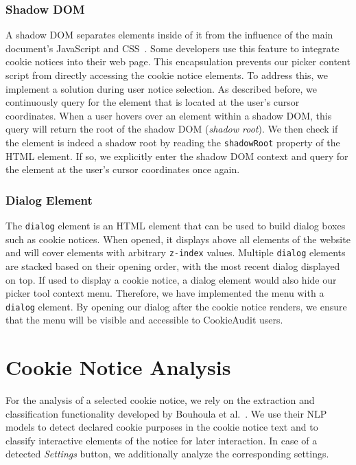 \subsubsection{Shadow DOM}
A shadow DOM separates elements inside of it from the influence of the main document's JavaScript and CSS~\cite{shadowDomMdn}.
Some developers use this feature to integrate cookie notices into their web page.
This encapsulation prevents our picker content script from directly accessing the cookie notice elements. 
To address this, we implement a solution during user notice selection.
As described before, we continuously query for the element that is located at the user's cursor coordinates.
When a user hovers over an element within a shadow DOM, this query will return the root of the shadow DOM (\emph{shadow root}). 
We then check if the element is indeed a shadow root by reading the \texttt{shadowRoot} property of the HTML element.
If so, we explicitly enter the shadow DOM context and query for the element at the user's cursor coordinates once again. 

\subsubsection{Dialog Element}
The \texttt{dialog} element is an HTML element that can be used to build dialog boxes such as cookie notices.
When opened, it displays above all elements of the website and will cover elements with arbitrary \texttt{z-index} values. 
Multiple \texttt{dialog} elements are stacked based on their opening order, with the most recent dialog displayed on top.
If used to display a cookie notice, a dialog element would also hide our picker tool context menu.
Therefore, we have implemented the menu with a \texttt{dialog} element.
By opening our dialog after the cookie notice renders, we ensure that the menu will be visible and accessible to CookieAudit users.

\section{Cookie Notice Analysis}
For the analysis of a selected cookie notice, we rely on the extraction and classification functionality developed by Bouhoula et al.~\cite{bouhoula2023automated}.
We use their NLP models to detect declared cookie purposes in the cookie notice text and to classify interactive elements of the notice for later interaction.
In case of a detected \emph{Settings} button, we additionally analyze the corresponding settings.

